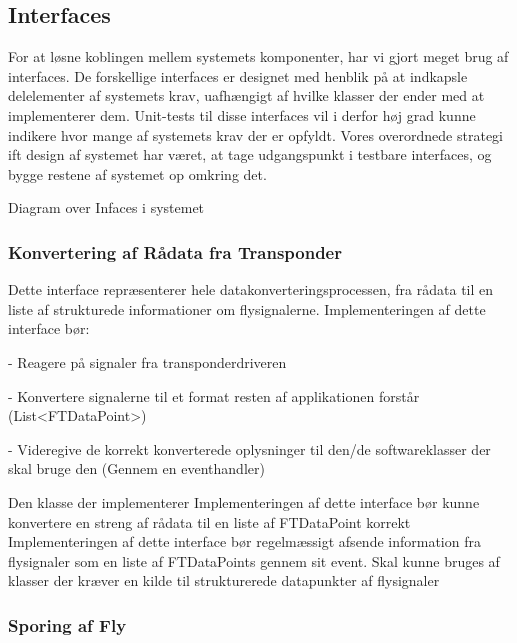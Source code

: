 
\newpage

\subsection{Interfaces}
For at løsne koblingen mellem systemets komponenter, har vi gjort meget brug af interfaces. 
De forskellige interfaces er designet med henblik på at indkapsle delelementer af systemets krav, uafhængigt af hvilke klasser der ender med at implementerer dem.
Unit-tests til disse interfaces vil i derfor høj grad kunne indikere hvor mange af systemets krav der er opfyldt. Vores overordnede strategi ift design af systemet har været, at tage udgangspunkt i testbare interfaces, og bygge restene af systemet op omkring det.

 {Diagram over Infaces i systemet}

\subsubsection{Konvertering af Rådata fra Transponder}

Dette interface repræsenterer hele datakonverteringsprocessen, fra rådata til en liste af strukturede informationer om flysignalerne.
Implementeringen af dette interface bør:

- Reagere på signaler fra transponderdriveren

- Konvertere signalerne til et format resten af applikationen forstår (List<FTDataPoint>)

- Videregive de korrekt konverterede oplysninger til den/de softwareklasser der skal bruge den (Gennem en eventhandler)

Den klasse der implementerer
Implementeringen af dette interface bør kunne konvertere en streng af rådata til en liste af FTDataPoint korrekt
Implementeringen af dette interface bør regelmæssigt afsende information fra flysignaler som en liste af FTDataPoints gennem sit event. Skal kunne bruges af klasser der kræver en kilde til strukturerede datapunkter af flysignaler
\subsubsection{Sporing af Fly}


